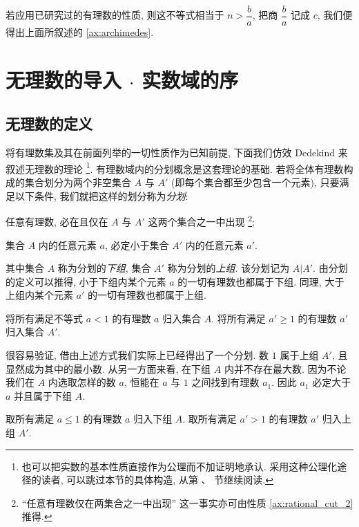 若应用已研究过的有理数的性质, 则这不等式相当于 $n > \dfrac{b}{a}$, 把商 $\dfrac{b}{a}$ 记成 $c$, 我们便得出上面所叙述的 \ref{ax:archimedes}.

\section{\texorpdfstring{无理数的导入 $\cdot$ 实数域的序}{无理数的导入·实数域的序}}

\subsection{无理数的定义} \label{subsec:6}

将有理数集及其在前面列举的一切性质作为已知前提, 下面我们仿效 Dedekind 来叙述无理数的理论
\footnote{也可以把实数的基本性质直接作为公理而不加证明地承认. 采用这种公理化途径的读者, 可以跳过本节的具体构造, 从第 、 节继续阅读.}.
有理数域内的分划概念是这套理论的基础.
若将全体有理数构成的集合划分为两个非空集合 $A$ 与 $A'$ (即每个集合都至少包含一个元素),
只要满足以下条件, 我们就把这样的划分称为\emph{分划}:
{\kaishu
    \label{ax:rational_cut_1} 任意有理数, 必在且仅在 $A$ 与 $A'$ 这两个集合之一中出现
    \footnote{“任意有理数仅在两集合之一中出现” 这一事实亦可由性质 \ref{ax:rational_cut_2} 推得.};

    \label{ax:rational_cut_2} 集合 $A$ 内的任意元素 $a$, 必定小于集合 $A'$ 内的任意元素 $a'$.
}

其中集合 $A$ 称为分划的\emph{下组}, 集合 $A'$ 称为分划的\emph{上组}.
该分划记为 $A|A'$.
由分划的定义可以推得, 小于下组内某个元素 $a$ 的一切有理数也都属于下组.
同理, 大于上组内某个元素 $a'$ 的一切有理数也都属于上组.

\begin{example} \label{ex:partition1}
    将所有满足不等式 $a < 1$ 的有理数 $a$ 归入集合 $A$.
    将所有满足 $a' \geq 1$ 的有理数 $a'$ 归入集合 $A'$.
\end{example}

很容易验证, 借由上述方式我们实际上已经得出了一个分划.
数 $1$ 属于上组 $A'$, 且显然成为其中的最小数.
从另一方面来看, 在下组 $A$ 内并不存在最大数.
因为不论我们在 $A$ 内选取怎样的数 $a$, 恒能在 $a$ 与 $1$ 之间找到有理数 $a_1$.
因此 $a_1$ 必定大于 $a$ 并且属于下组 $A$.

\begin{example} \label{ex:partition2}
    取所有满足 $a \leq 1$ 的有理数 $a$ 归入下组 $A$.
    取所有满足 $a' > 1$ 的有理数 $a'$ 归入上组 $A'$.
\end{example}


